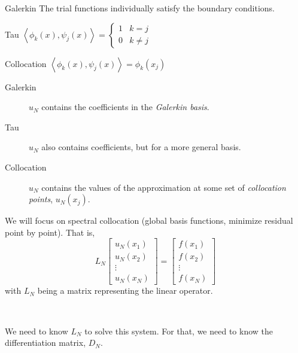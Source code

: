 \documentclass{beamer}
\newcommand{\inner}[2]{\left \langle #1, #2 \right \rangle}
\begin{document}
\begin{frame}

\begin{block}{Galerkin}
The trial functions individually satisfy the boundary conditions.
\end{block}

\begin{block}{Tau} %
$\inner{\phi_k(x)}{\psi_j(x)} = \begin{cases} 1 & k = j \\ 0 & k \neq j \end{cases} $
\end{block}

\begin{block}{Collocation}
$\inner{\phi_k(x)}{\psi_j(x)} = \phi_k(x_j)$
\end{block}
\end{frame}

\begin{frame}
\begin{description}
\item[Galerkin] $u_N$ contains the coefficients in the \textit{Galerkin basis}.
\item[Tau] $u_N$ also contains coefficients, but for a more general basis.
\item[Collocation] $u_N$ contains the values of the approximation at some set of \textit{collocation points}, $u_N(x_j)$.
\end{description}
\end{frame}

\begin{frame}

We will focus on spectral collocation (global basis functions, minimize residual point by point).
That is,
\begin{equation*}
L_N \begin{bmatrix}
u_N(x_1) \\ u_N(x_2) \\ \vdots \\ u_N(x_N)
\end{bmatrix} = \begin{bmatrix}
f(x_1) \\ f(x_2) \\ \vdots \\ f(x_N)
\end{bmatrix}
\end{equation*}
with $L_N$ being a matrix representing the linear operator.

~

We need to know $L_N$ to solve this system.
For that, we need to know the differentiation matrix, $D_N$.

\end{frame}
\end{document}
